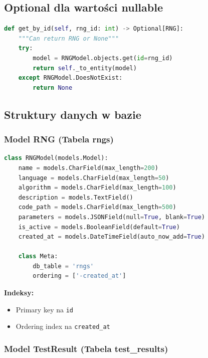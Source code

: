 \documentclass[12pt,a4paper]{article}
\begin{document}
\subsection{Optional dla wartości nullable}

\begin{lstlisting}[language=Python]
def get_by_id(self, rng_id: int) -> Optional[RNG]:
    """Can return RNG or None"""
    try:
        model = RNGModel.objects.get(id=rng_id)
        return self._to_entity(model)
    except RNGModel.DoesNotExist:
        return None
\end{lstlisting}

\subsection{Struktury danych w bazie}

\subsubsection{Model RNG (Tabela rngs)}

\begin{lstlisting}[language=Python, caption=Django Model]
class RNGModel(models.Model):
    name = models.CharField(max_length=200)
    language = models.CharField(max_length=50)
    algorithm = models.CharField(max_length=100)
    description = models.TextField()
    code_path = models.CharField(max_length=500)
    parameters = models.JSONField(null=True, blank=True)
    is_active = models.BooleanField(default=True)
    created_at = models.DateTimeField(auto_now_add=True)
    
    class Meta:
        db_table = 'rngs'
        ordering = ['-created_at']
\end{lstlisting}

\textbf{Indeksy:}
\begin{itemize}
    \item Primary key na \texttt{id}
    \item Ordering index na \texttt{created\_at}
\end{itemize}

\subsubsection{Model TestResult (Tabela test\_results)}
\end{document}
